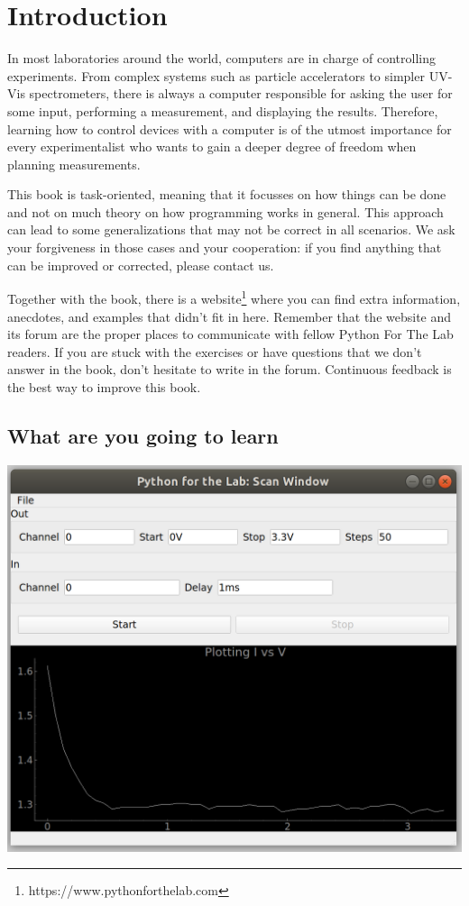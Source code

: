 \chapter{Introduction}\label{ch:introduction}
In most laboratories around the world, computers are in charge of controlling experiments. From complex systems such as particle accelerators to simpler UV-Vis spectrometers, there is always a computer responsible for asking the user for some input, performing a measurement, and displaying the results. Therefore, learning how to control devices with a computer is of the utmost importance for every experimentalist who wants to gain a deeper degree of freedom when planning measurements.

This book is task-oriented, meaning that it focusses on how things can be done and not on much theory on how programming works in general. This approach can lead to some generalizations that may not be correct in all scenarios. We ask your forgiveness in those cases and your cooperation: if you find anything that can be improved or corrected, please contact us.

Together with the book, there is a website\footnote{https://www.pythonforthelab.com} where you can find extra information, anecdotes, and examples that didn't fit in here. Remember that the website and its forum are the proper places to communicate with fellow Python For The Lab readers. If you are stuck with the exercises or have questions that we don't answer in the book, don't hesitate to write in the forum. Continuous feedback is the best way to improve this book.

\section{What are you going to learn}\label{sec:what-are-you-going-to-learn}
\begin{center}
\includegraphics[width=.6\linewidth]{images/Chapter_01/screenshot.png}
\end{center}

